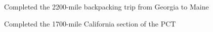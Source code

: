 \documentclass[letterpaper]{deedy-resume} %
\begin{document}
\begin{minipage}[t]{0.66\textwidth}

Completed the 2200-mile backpacking trip from Georgia to Maine

Completed the 1700-mile California section of the PCT

\sectionspace %











\end{minipage}
\end{document}
